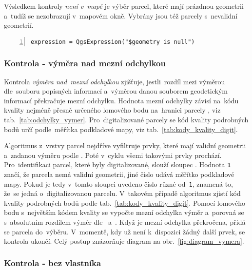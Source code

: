 Výsledkem kontroly \textit{není v~mapě} je výběr parcel, které mají
prázdnou geometrii a~tudíž se nezobrazují v~mapovém okně. Vybrány jsou
též parcely s~nevalidní geo\-metrií.

{\scriptsize
\begin{lstlisting}[style=python, caption={Kontrola \textit{není
v~mapě}~– vzorec pro~výběr prvků}, captionpos=b,
label=kontrola_mapa_kod, backgroundcolor = \color{light-gray},
numbers=left]
expression = QgsExpression("$geometry is null")
\end{lstlisting}}

\subsubsection{Kontrola - výměra nad mezní odchylkou}
\label{kontrola_vymera}

Kontrola \textit{výměra nad~mezní odchylkou} zjišťuje, jestli~rozdíl
mezi výměrou dle~souboru popisných informací a~výměrou danou souborem
geodetickým informací překračuje mezní odchylku. Hodnota mezní
odchylky závisí na~kódu kvality nejméně přesně určeného lomového bodu
na~hranici parcely \citep{vyhlaska_357}, viz
tab.~\ref{tab:odchylky_vymer}. Pro~digitalizované parcely se kód
kvality podrobných bodů určí podle~měřítka podkladové mapy, viz
tab.~\ref{tab:kody_kvality_digit}.

Algoritmus z~vrstvy parcel nejdříve vyfiltruje prvky, které mají
validní geometrii a~zadanou výměru podle . Poté v~cyklu všemi
takovými prvky prochází. Pro~identifikaci parcel, které byly
digitalizované, slouží sloupec
\texttt{}. Hodnota \texttt{1} značí,
že parcela nemá validní geometrii, jiné číslo udává měřítko podkladové
mapy. Pokud je tedy v~tomto sloupci uvedeno číslo různé od~\texttt{1},
znamená to, že~se jedná o~digitalizovanou parcelu. V~takovém případě
algoritmus zjistí kód kvality podrobných bodů podle
tab.~\ref{tab:kody_kvality_digit}. Pomocí lomového bodu s~největším
kódem kvality se vypočte mezní odchylka výměr a~porovná se
s~absolutním rozdílem výměr dle~ a~. Když je mezní
odchylka překročena, přidá se parcela do~výběru. V~momentě, kdy už není
k~dispozici žádný další prvek, se kontrola ukončí. Celý postup
znázorňuje diagram na obr.~\ref{fig:diagram_vymera}.

\subsubsection{Kontrola - bez vlastníka}
\label{kontrola_bez_vlastnika}

